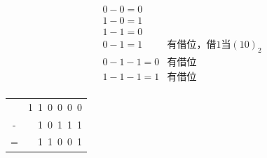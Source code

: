 \begin{frame}

\[
\boxed{
\begin{array}{rl}
0-0=0&\\
1-0=1&\\
1-1=0&\\
0-1=1&\mbox{有借位，借1当$(10)_2$}\\
0-1-1=0&\mbox{有借位}\\
1-1-1=1&\mbox{有借位}\\
\end{array}
}
\]

\begin{table}
\centering
\begin{tabular}{cD{.}{.}{3}}
&1~1~0~0~0~0\\
-&1~0~1~1~1\\
\hline
=&1~1~0~0~1
\end{tabular}
\end{table}
\end{frame}

